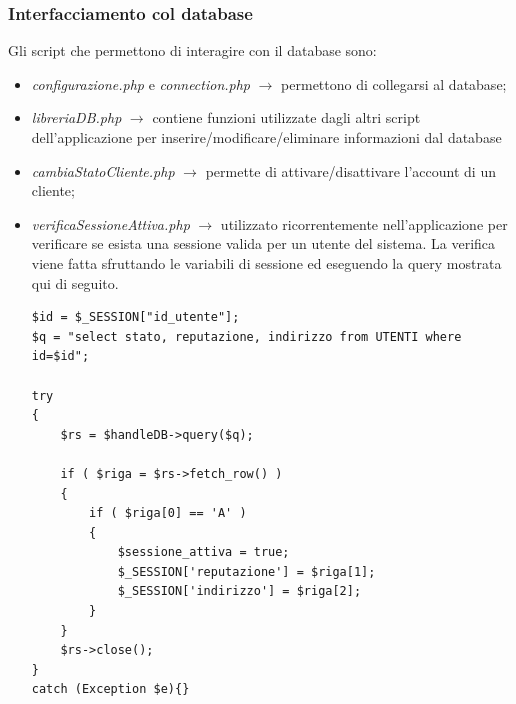 \documentclass[a4paper, 14pt]{article}
\begin{document}
\begin{flushleft}
			\subsubsection{Interfacciamento col database}
			Gli script che permettono di interagire con il database sono:
				\begin{itemize}
					\item \textit{configurazione.php} e \textit{connection.php} $\rightarrow$ permettono di collegarsi al database;
					\item \textit{libreriaDB.php} $\rightarrow$ contiene funzioni utilizzate dagli altri script dell'applicazione per
																inserire/modificare/eliminare informazioni dal database
					\item \textit{cambiaStatoCliente.php} $\rightarrow$ permette di attivare/disattivare l'account di un cliente;
					\item \textit{verificaSessioneAttiva.php} $\rightarrow$ utilizzato ricorrentemente nell'applicazione per verificare
						se esista una sessione valida per un utente del sistema. La verifica viene fatta sfruttando le variabili di sessione ed eseguendo la query mostrata qui di seguito.
						\begin{lstlisting}[backgroundcolor=\color{coloreSfondoGrammatiche}]
$id = $_SESSION["id_utente"];
$q = "select stato, reputazione, indirizzo from UTENTI where id=$id"; 

try
{
	$rs = $handleDB->query($q);
	
	if ( $riga = $rs->fetch_row() ) 
	{
		if ( $riga[0] == 'A' )
		{
			$sessione_attiva = true;
			$_SESSION['reputazione'] = $riga[1];
			$_SESSION['indirizzo'] = $riga[2];
		}
	}
	$rs->close();
}
catch (Exception $e){}
						\end{lstlisting}	
				\end{itemize}
		

\end{flushleft}
\end{document}
